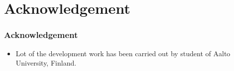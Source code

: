 \documentclass{sdkslides}
\newcommand{\sectname}{Section Name}
\begin{document}
\renewcommand{\sectname}{Acknowledgement}
\section{\sectname}
\begin{frame}[t]
    \frametitle{\sectname}
    \begin{itemize}
        \item Lot of the development work has been carried out by student of
            Aalto University, Finland.  
    \end{itemize}
\end{frame}
\end{document}
